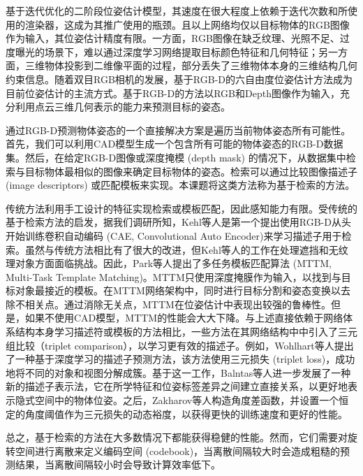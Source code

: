 \documentclass[12pt]{article}
\begin{document}
基于迭代优化的二阶段位姿估计模型，其速度在很大程度上依赖于迭代次数和所使用的渲染器，这成为其推广使用的瓶颈。且以上网络均仅以目标物体的RGB图像作为输入，其位姿估计精度有限。一方面，RGB图像在缺乏纹理、光照不足、过度曝光的场景下，难以通过深度学习网络提取目标颜色特征和几何特征；另一方面，三维物体投影到二维像平面的过程，部分丢失了三维物体本身的三维结构几何约束信息。随着双目RGB相机的发展，基于RGB-D的六自由度位姿估计方法成为目前位姿估计的主流方式。基于RGB-D的方法以RGB和Depth图像作为输入，充分利用点云三维几何表示的能力来预测目标的姿态。

通过RGB-D预测物体姿态的一个直接解决方案是遍历当前物体姿态所有可能性。首先，我们可以利用CAD模型生成一个包含所有可能的物体姿态的RGB-D数据集。然后，在给定RGB-D图像或深度掩模 (depth mask) 的情况下，从数据集中检索与目标物体最相似的图像来确定目标物体的姿态。检索可以通过比较图像描述子(image descriptors) 或匹配模板来实现。本课题将这类方法称为基于检索的方法。

传统方法\cite{hinterstoisser43,huttenlocher44,steger45,hinterstoisser46,hinterstoisser47}利用手工设计的特征实现检索或模板匹配，因此感知能力有限。受传统的基于检索方法的启发，据我们调研所知，Kehl等人\cite{kehl48}是第一个提出使用RGB-D从头开始训练卷积自动编码 (CAE, Convolutional Auto Encoder)\cite{masci49}来学习描述子用于检索。虽然与传统方法相比有了很大的改进，但Kehl等人的工作在处理遮挡和无纹理对象方面面临挑战。因此，Park等人\cite{park50}提出了多任务模板匹配算法 (MTTM, Multi-Task Template Matching)。MTTM只使用深度掩膜作为输入，以找到与目标对象最接近的模板。在MTTM网络架构中，同时进行目标分割和姿态变换以去除不相关点。通过消除无关点，MTTM在位姿估计中表现出较强的鲁棒性。但是，如果不使用CAD模型，MTTM的性能会大大下降。与上述直接依赖于网络体系结构本身学习描述符或模板的方法相比，一些方法在其网络结构中中引入了三元组比较（triplet comparison），以学习更有效的描述子。例如，Wohlhart等人\cite{wohlhart51}提出了一种基于深度学习的描述子预测方法，该方法使用三元损失 (triplet loss)，成功地将不同的对象和视图分解成簇。基于这一工作\cite{wohlhart51}，Balntas等人\cite{balntas52}进一步发展了一种新的描述子表示法，它在所学特征和位姿标签差异之间建立直接关系，以更好地表示隐式空间中的物体位姿。之后，Zakharov等人\cite{zakharov53}构造角度差函数，并设置一个恒定的角度阈值作为三元损失的动态裕度，以获得更快的训练速度和更好的性能。

总之，基于检索的方法在大多数情况下都能获得稳健的性能。然而，它们需要对旋转空间进行离散来定义编码空间 (codebook)，当离散间隔较大时会造成粗糙的预测结果，当离散间隔较小时会导致计算效率低下。
\end{document}
